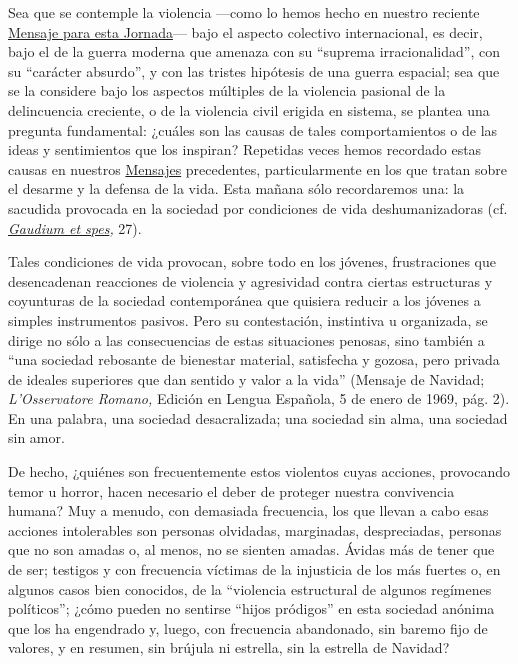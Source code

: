 Sea que se contemple la violencia ---como lo hemos hecho en nuestro
reciente
\href{/content/paul-vi/es/messages/peace/documents/hf_p-vi_mes_19771208_xi-world-day-for-peace.html}{Mensaje
	para esta Jornada}--- bajo el aspecto colectivo internacional, es decir,
bajo el de la guerra moderna que amenaza con su ``suprema
irracionalidad'', con su ``carácter absurdo'', y con las tristes
hipótesis de una guerra espacial; sea que se la considere bajo los
aspectos múltiples de la violencia pasional de la delincuencia
creciente, o de la violencia civil erigida en sistema, se plantea una
pregunta fundamental: ¿cuáles son las causas de tales comportamientos o
de las ideas y sentimientos que los inspiran? Repetidas veces hemos
recordado estas causas en nuestros
\href{/content/paul-vi/es/messages/peace/index.html}{Mensajes}
precedentes, particularmente en los que tratan sobre el desarme y la
defensa de la vida. Esta mañana sólo recordaremos una: la sacudida
provocada en la sociedad por condiciones de vida deshumanizadoras (cf.
\emph{\href{http://www.vatican.va/archive/hist_councils/ii_vatican_council/documents/vat-ii_const_19651207_gaudium-et-spes_sp.html}{Gaudium
		et spes},} 27).

Tales condiciones de vida provocan, sobre todo en los jóvenes,
frustraciones que desencadenan reacciones de violencia y agresividad
contra ciertas estructuras y coyunturas de la sociedad contemporánea que
quisiera reducir a los jóvenes a simples instrumentos pasivos. Pero su
contestación, instintiva u organizada, se dirige no sólo a las
consecuencias de estas situaciones penosas, sino también a ``una
sociedad rebosante de bienestar material, satisfecha y gozosa, pero
privada de ideales superiores que dan sentido y valor a la vida''
(Mensaje de Navidad; \emph{L'Osservatore Romano,} Edición en Lengua
Española, 5 de enero de 1969, pág. 2). En una palabra, una sociedad
desacralizada; una sociedad sin alma, una sociedad sin amor.

De hecho, ¿quiénes son frecuentemente estos violentos cuyas acciones,
provocando temor u horror, hacen necesario el deber de proteger nuestra
convivencia humana? Muy a menudo, con demasiada frecuencia, los que
llevan a cabo esas acciones intolerables son personas olvidadas,
marginadas, despreciadas, personas que no son amadas o, al menos, no se
sienten amadas. Ávidas más de tener que de ser; testigos y con
frecuencia víctimas de la injusticia de los más fuertes o, en algunos
casos bien conocidos, de la ``violencia estructural de algunos regímenes
políticos''; ¿cómo pueden no sentirse ``hijos pródigos'' en esta
sociedad anónima que los ha engendrado y, luego, con frecuencia
abandonado, sin baremo fijo de valores, y en resumen, sin brújula ni
estrella, sin la estrella de Navidad?

